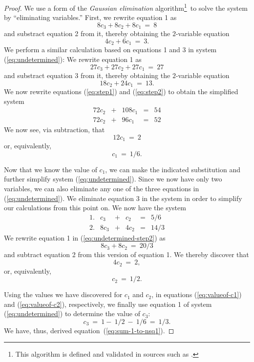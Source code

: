 \begin{proof}
We use a form of the {\it Gaussian elimination}
algorithm\footnote{This algorithm is defined and validated in sources
  such as \cite{CLRS}.}~to solve the system by ``eliminating
variables.''  First, we rewrite equation 1 as
\[ 8 c_3 + 8 c_2 + 8 c_1 \ = \ 8 \]
and substract equation 2 from it, thereby obtaining the $2$-variable
equation
\begin{equation}
\label{eq:step1}
4c_2 + 6 c_1 \ = \ 3.
\end{equation}
We perform a similar calculation based on equations 1 and 3 in
system (\ref{eq:undetermined}):  We rewrite equation 1 as
\[ 27 c_3 + 27 c_2 + 27 c_1 \ = \ 27 \]
and substract equation 3 from it, thereby obtaining the $2$-variable
equation
\begin{equation}
\label{eq:step2}
18 c_2 + 24 c_1 \ = \ 13.
\end{equation}
We now rewrite equations (\ref{eq:step1}) and (\ref{eq:step2}) to
obtain the simplified system
\[
\begin{array}{ccccc}
72 c_2 & + & 108 c_1 & = & 54 \\
72 c_2 & + &  96 c_1 & = & 52
\end{array}
\]
We now see, via subtraction, that
\[ 12 c_1 \ = \ 2 \]
or, equivalently,
\begin{equation}
\label{eq:valueof-c1}
c_1 \ = \ 1/6.
\end{equation}

Now that we know the value of $c_1$, we can make the indicated
substitution and further simplify system (\ref{eq:undetermined}).
Since we now have only two variables, we can also eliminate any one
of the three equations in (\ref{eq:undetermined}).  We eliminate
equation 3 in the system in order to simplify our calculations from
this point on.  We now have the system
\begin{equation}
\label{eq:undetermined-step2}
\begin{array}{lccccc}
1. &
c_3  & + & c_2   & = & 5/6 \\
2. &
8c_3 & + & 4 c_2 & = & 14/3 
\end{array}
\end{equation}
We rewrite equation 1 in (\ref{eq:undetermined-step2}) as
\[ 8 c_3 + 8 c_2 \ = \ 20/3 \]
and subtract equation 2 from this version of equation 1.  We thereby
discover that
\[ 4 c_2 \ = \ 2, \]
or, equivalently,
\begin{equation}
\label{eq:valueof-c2}
c_2 \ = \ 1/2.
\end{equation}

Using the values we have discovered for $c_1$ and $c_2$, in equations
(\ref{eq:valueof-c1}) and (\ref{eq:valueof-c2}), respectively, we
finally use equation 1 of system (\ref{eq:undetermined}) to determine
the value of $c_3$:
\begin{equation}
\label{eq:valueof-c3}
c_3 \ = \ 1 - \ 1/2 \ - \ 1/6 \ = \ 1/3.
\end{equation}
We have, thus, derived equation~(\ref{eq:sum-1-to-nsq1}).


\end{proof}
